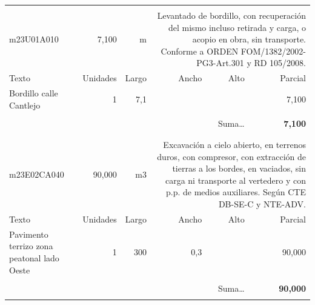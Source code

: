 \documentclass{book}%
\begin{document}
\begin{longtable}{lrrrrr}
&&&&&\\%
m23U01A010&     7,100& m&\multicolumn{3}{p{6cm}}{\scriptsize Levantado de bordillo, con recuperación del mismo incluso retirada y carga, o acopio en obra, sin transporte. Conforme a ORDEN FOM/1382/2002-PG3-Art.301 y RD 105/2008.\normalsize}\\%
Texto&Unidades&Largo&Ancho&Alto&Parcial\\%
\hline%
\multicolumn{1}{p{3.5cm}}{Bordillo calle Cantlejo}&1&7,1&&&     7,100\\%
&&&&&\\%
\multicolumn{5}{r}{Suma\ldots}&\textbf{     7,100}\\%
\hline%
&&&&&\\%
&&&&&\\%
m23E02CA040&    90,000& m3&\multicolumn{3}{p{6cm}}{\scriptsize Excavación a cielo abierto, en terrenos duros, con compresor, con extracción de tierras a los bordes, en vaciados, sin carga ni transporte al vertedero y con p.p. de medios auxiliares. Según CTE DB-SE-C y NTE-ADV.\normalsize}\\%
Texto&Unidades&Largo&Ancho&Alto&Parcial\\%
\hline%
\multicolumn{1}{p{3.5cm}}{Pavimento terrizo zona peatonal lado Oeste}&1&300&0,3&&    90,000\\%
&&&&&\\%
\multicolumn{5}{r}{Suma\ldots}&\textbf{    90,000}\\%
\hline%
&&&&&\\%
\end{longtable}%
\newpage

%
\end{document}
